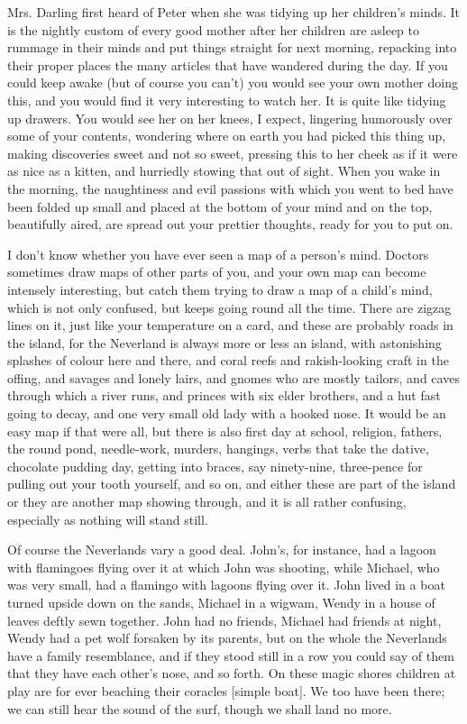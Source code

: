Mrs. Darling first heard of Peter when she was tidying up her children's
minds. It is the nightly custom of every good mother after her children
are asleep to rummage in their minds and put things straight for next
morning, repacking into their proper places the many articles that have
wandered during the day. If you could keep awake (but of course you can't)
you would see your own mother doing this, and you would find it very
interesting to watch her. It is quite like tidying up drawers. You would
see her on her knees, I expect, lingering humorously over some of your
contents, wondering where on earth you had picked this thing up, making
discoveries sweet and not so sweet, pressing this to her cheek as if it
were as nice as a kitten, and hurriedly stowing that out of sight. When
you wake in the morning, the naughtiness and evil passions with which you
went to bed have been folded up small and placed at the bottom of your
mind and on the top, beautifully aired, are spread out your prettier
thoughts, ready for you to put on.


I don't know whether you have ever seen a map of a person's mind. Doctors
sometimes draw maps of other parts of you, and your own map can become
intensely interesting, but catch them trying to draw a map of a child's
mind, which is not only confused, but keeps going round all the time.
There are zigzag lines on it, just like your temperature on a card, and
these are probably roads in the island, for the Neverland is always more
or less an island, with astonishing splashes of colour here and there, and
coral reefs and rakish-looking craft in the offing, and savages and lonely
lairs, and gnomes who are mostly tailors, and caves through which a river
runs, and princes with six elder brothers, and a hut fast going to decay,
and one very small old lady with a hooked nose. It would be an easy map if
that were all, but there is also first day at school, religion, fathers,
the round pond, needle-work, murders, hangings, verbs that take the
dative, chocolate pudding day, getting into braces, say ninety-nine,
three-pence for pulling out your tooth yourself, and so on, and either
these are part of the island or they are another map showing through, and
it is all rather confusing, especially as nothing will stand still.


Of course the Neverlands vary a good deal. John's, for instance, had a
lagoon with flamingoes flying over it at which John was shooting, while
Michael, who was very small, had a flamingo with lagoons flying over it.
John lived in a boat turned upside down on the sands, Michael in a wigwam,
Wendy in a house of leaves deftly sewn together. John had no friends,
Michael had friends at night, Wendy had a pet wolf forsaken by its
parents, but on the whole the Neverlands have a family resemblance, and if
they stood still in a row you could say of them that they have each
other's nose, and so forth. On these magic shores children at play are for
ever beaching their coracles [simple boat]. We too have been there; we can
still hear the sound of the surf, though we shall land no more.


